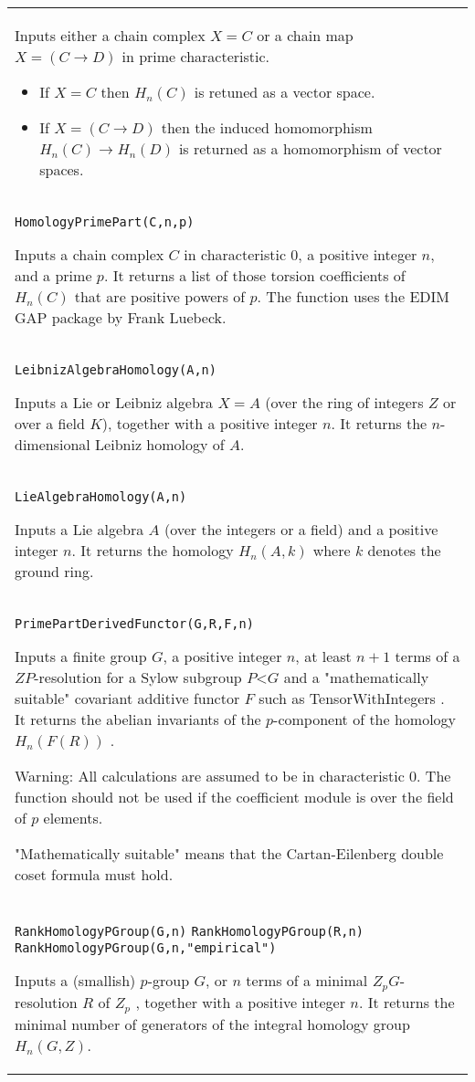 \documentclass[a4paper,11pt]{report}
\begin{document}
{\begin{center}
\begin{tabular}{|l|}
 Inputs either a chain complex $X=C$ or a chain map $X=(C \longrightarrow D)$ in prime characteristic. 
\begin{itemize}
\item If $X=C$ then $H_n(C)$ is retuned as a vector space.
\item  If $X=(C \longrightarrow D)$ then the induced homomorphism $H_n(C) \longrightarrow H_n(D)$ is returned as a homomorphism of vector spaces. 
\end{itemize}
 \\
 \index{HomologyPrimePart} \texttt{HomologyPrimePart(C,n,p)} 

 Inputs a chain complex $C$ in characteristic 0, a positive integer $n$, and a prime $p$. It returns a list of those torsion coefficients of $H_n(C)$ that are positive powers of $p$. The function uses the EDIM GAP package by Frank Luebeck. \\
 \index{LeibnizAlgebraHomology} \texttt{LeibnizAlgebraHomology(A,n)} 

 Inputs a Lie or Leibniz algebra $X=A$ (over the ring of integers $Z$ or over a field $K$), together with a positive integer $n$. It returns the $n$-dimensional Leibniz homology of $A$. \\
 \index{LieAlgebraHomology} \texttt{LieAlgebraHomology(A,n)} 

 Inputs a Lie algebra $A$ (over the integers or a field) and a positive integer $n$. It returns the homology $H_n(A,k)$ where $k$ denotes the ground ring. \\
 \index{PrimePartDerivedFunctor} \texttt{PrimePartDerivedFunctor(G,R,F,n)} 

 Inputs a finite group $G$, a positive integer $n$, at least $n+1$ terms of a $ZP$-resolution for a Sylow subgroup $P${\textless}$G$ and a "mathematically suitable" covariant additive functor $F$ such as TensorWithIntegers . It returns the abelian invariants of the $p$-component of the homology $H_n(F(R))$ . 

 Warning: All calculations are assumed to be in characteristic 0. The function
should not be used if the coefficient module is over the field of $p$ elements. 

 "Mathematically suitable" means that the Cartan-Eilenberg double coset formula
must hold. \\
 \index{RankHomologyPGroup} \texttt{RankHomologyPGroup(G,n)} \texttt{RankHomologyPGroup(R,n)} \texttt{RankHomologyPGroup(G,n,"empirical")} 

 Inputs a (smallish) $p$-group $G$, or $n$ terms of a minimal $Z_pG$-resolution $R$ of $Z_p$ , together with a positive integer $n$. It returns the minimal number of generators of the integral homology group $H_n(G,Z)$. 


\end{tabular}
\end{center}}
\end{document}
